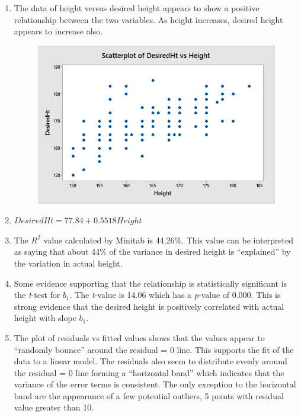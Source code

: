 \documentclass{article}
\begin{document}
\begin{enumerate}
\def\labelenumi{\alph{enumi})}
\item
  The data of height versus desired height appears to show a positive
  relationship between the two variables. As height increases, desired
  height appears to increase also. 
  
  \begin{figure}[h!]
 \centering
 \includegraphics[scale=.5]{./images/scatterplot_height-vs-desiredHeight.png}
\end{figure}

\item
  \(DesiredHt = 77.84 + 0.5518 Height\)
\item
  The \(R^2\) value calculated by Minitab is 44.26\%. This value can be
  interpreted as saying that about 44\% of the variance in desired
  height is ``explained'' by the variation in actual height.
\item
  Some evidence supporting that the relationship is statistically
  significant is the \emph{t}-test for \(b_1\). The \emph{t}-value is
  14.06 which has a \emph{p}-value of 0.000. This is strong evidence
  that the desired height is positively correlated with actual height
  with slope \(b_1\).
  
\item
  The plot of residuals vs fitted values shows that the values appear to
  ``randomly bounce'' around the residual = 0 line. This supports the
  fit of the data to a linear model. The residuals also seem to
  distribute evenly around the residual = 0 line forming a ``horizontal
  band'' which indicates that the variance of the error terms is
  consistent. The only exception to the horizontal band are the
  appearance of a few potential outliers, 5 points with residual value
  greater than 10. 
  

\end{enumerate}
\end{document}
